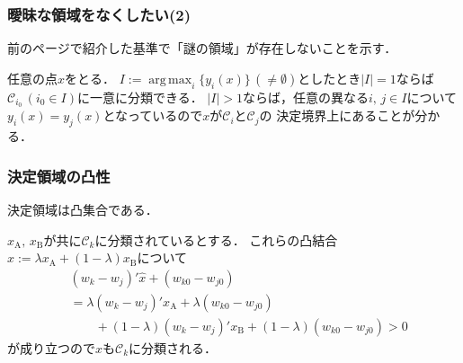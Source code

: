 \documentclass[10pt,%
hyperref={unicode}]{beamer}
\makeatletter
\DeclareMathOperator*{\argmax}{arg\,max}
\renewenvironment{proof}{\par%
\pushQED{\qed}\normalfont\topsep6\p@\@plus6\p@\relax\trivlist%
\item[\hskip\labelsep{\bfseries 証明}\hskip\labelsep]\ignorespaces}{\popQED\endtrivlist\@endpefalse}
\makeatother
\begin{document}
\begin{frame}
    \frametitle{曖昧な領域をなくしたい(2)}
    前のページで紹介した基準で「謎の領域」が存在しないことを示す．

    \bigskip

    任意の点$x$をとる．
    $I := \argmax_i \{y_i(x)\}\,(\neq \emptyset)$としたとき$|I| = 1$ならば
    $\mathcal{C}_{i_0}\,(i_0 \in I)$に一意に分類できる．
    $|I| > 1$ならば，任意の異なる$i,\,j \in I$について
    $y_i(x) = y_j(x)$となっているので$x$が$\mathcal{C}_i$と$\mathcal{C}_j$の
    決定境界上にあることが分かる．

    \bigskip

    \begin{center}
    \end{center}
\end{frame}

\begin{frame}
    \frametitle{決定領域の凸性}
    決定領域は凸集合である．

    \bigskip

    \begin{proof}
    $x_\mathrm{A},\,x_\mathrm{B}$が共に$\mathcal{C}_k$に分類されているとする．
    これらの凸結合$\hat{x} := \lambda x_\mathrm{A} + (1 - \lambda) x_\mathrm{B}$について
    \begin{align*}
        &(w_k - w_j)'\hat{x} + (w_{k0} - w_{j0}) \\
        &= \lambda (w_k - w_j)'x_\mathrm{A} + \lambda (w_{k0} - w_{j0}) \\
        &\qquad + (1 - \lambda) (w_k - w_j)' x_\mathrm{B} + (1 - \lambda) (w_{k0} - w_{j0})
        >0
    \end{align*}
    が成り立つので$\hat{x}$も$\mathcal{C}_k$に分類される．
    \end{proof}
\end{frame}
\end{document}
